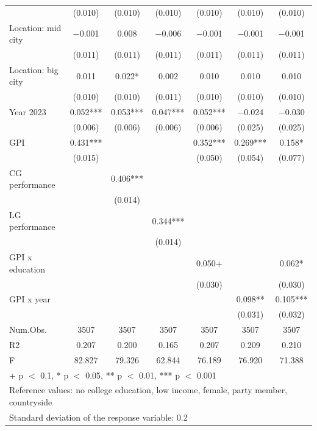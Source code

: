 \documentclass[
  letterpaper,
  DIV=11,
  numbers=noendperiod]{scrartcl}
\begin{document}
\begin{table}
{\begin{tabular}[t]{lcccccc}
 & (\num{0.010}) & (\num{0.010}) & (\num{0.010}) & (\num{0.010}) & (\num{0.010}) & (\num{0.010})\\
Location: mid city & \num{-0.001} & \num{0.008} & \num{-0.006} & \num{-0.001} & \num{-0.001} & \num{-0.001}\\
 & (\num{0.011}) & (\num{0.011}) & (\num{0.011}) & (\num{0.011}) & (\num{0.011}) & (\num{0.011})\\
Location: big city & \num{0.011} & \num{0.022}* & \num{0.002} & \num{0.010} & \num{0.010} & \num{0.010}\\
 & (\num{0.010}) & (\num{0.010}) & (\num{0.011}) & (\num{0.010}) & (\num{0.010}) & (\num{0.010})\\
Year 2023 & \num{0.052}*** & \num{0.053}*** & \num{0.047}*** & \num{0.052}*** & \num{-0.024} & \num{-0.030}\\
 & (\num{0.006}) & (\num{0.006}) & (\num{0.006}) & (\num{0.006}) & (\num{0.025}) & (\num{0.025})\\
GPI & \num{0.431}*** &  &  & \num{0.352}*** & \num{0.269}*** & \num{0.158}*\\
 & (\num{0.015}) &  &  & (\num{0.050}) & (\num{0.054}) & (\num{0.077})\\
CG performance &  & \num{0.406}*** &  &  &  & \\
 &  & (\num{0.014}) &  &  &  & \\
LG performance &  &  & \num{0.344}*** &  &  & \\
 &  &  & (\num{0.014}) &  &  & \\
GPI x education &  &  &  & \num{0.050}+ &  & \num{0.062}*\\
 &  &  &  & (\num{0.030}) &  & (\num{0.030})\\
GPI x year &  &  &  &  & \num{0.098}** & \num{0.105}***\\
 &  &  &  &  & (\num{0.031}) & (\num{0.032})\\
\midrule
Num.Obs. & \num{3507} & \num{3507} & \num{3507} & \num{3507} & \num{3507} & \num{3507}\\
R2 & \num{0.207} & \num{0.200} & \num{0.165} & \num{0.207} & \num{0.209} & \num{0.210}\\
F & \num{82.827} & \num{79.326} & \num{62.844} & \num{76.189} & \num{76.920} & \num{71.388}\\
\bottomrule
\multicolumn{7}{l}{\rule{0pt}{1em}+ p $<$ 0.1, * p $<$ 0.05, ** p $<$ 0.01, *** p $<$ 0.001}\\
\multicolumn{7}{l}{\rule{0pt}{1em}Reference values: no college education, low income, female, party member, countryside}\\
\multicolumn{7}{l}{\rule{0pt}{1em}Standard deviation of the response variable:  0.2}\\
\end{tabular}

}

\end{table}%
\end{document}
